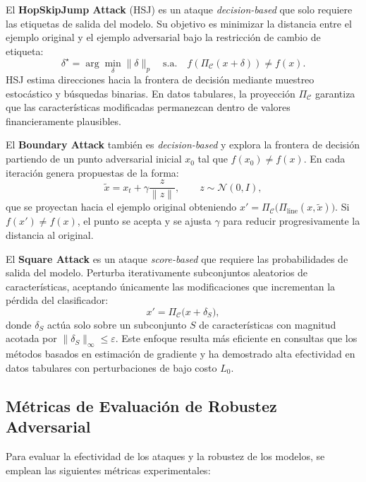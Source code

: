 El \textbf{HopSkipJump Attack} (HSJ) \cite{chen2019hopskipjump} es un ataque \textit{decision-based} que solo requiere las etiquetas de salida del modelo. Su objetivo es minimizar la distancia entre el ejemplo original y el ejemplo adversarial bajo la restricción de cambio de etiqueta:
\[
\delta^\star = \arg\min_{\delta} \|\delta\|_p \quad \text{s.a.} \quad f(\Pi_{\mathcal{C}}(x+\delta)) \neq f(x).
\]
HSJ estima direcciones hacia la frontera de decisión mediante muestreo estocástico y búsquedas binarias. En datos tabulares, la proyección $\Pi_{\mathcal{C}}$ garantiza que las características modificadas permanezcan dentro de valores financieramente plausibles.

El \textbf{Boundary Attack} \cite{brendel2018decision} también es \textit{decision-based} y explora la frontera de decisión partiendo de un punto adversarial inicial $x_0$ tal que $f(x_0) \neq f(x)$. En cada iteración genera propuestas de la forma:
\[
\tilde{x} = x_t + \gamma \frac{z}{\|z\|}, \qquad z \sim \mathcal{N}(0,I),
\]
que se proyectan hacia el ejemplo original obteniendo $x' = \Pi_{\mathcal{C}}\big(\Pi_{\mathrm{line}}(x,\tilde{x})\big)$. Si $f(x') \neq f(x)$, el punto se acepta y se ajusta $\gamma$ para reducir progresivamente la distancia al original.

El \textbf{Square Attack} \cite{andriushchenko2020squareattackqueryefficientblackbox} es un ataque \textit{score-based} que requiere las probabilidades de salida del modelo. Perturba iterativamente subconjuntos aleatorios de características, aceptando únicamente las modificaciones que incrementan la pérdida del clasificador:
\[
x' = \Pi_{\mathcal{C}}\big(x + \delta_S\big),
\]
donde $\delta_S$ actúa solo sobre un subconjunto $S$ de características con magnitud acotada por $\|\delta_S\|_\infty \leq \varepsilon$. Este enfoque resulta más eficiente en consultas que los métodos basados en estimación de gradiente y ha demostrado alta efectividad en datos tabulares con perturbaciones de bajo costo $L_0$.


\subsection{Métricas de Evaluación de Robustez Adversarial}

Para evaluar la efectividad de los ataques y la robustez de los modelos, se emplean las siguientes métricas experimentales:

